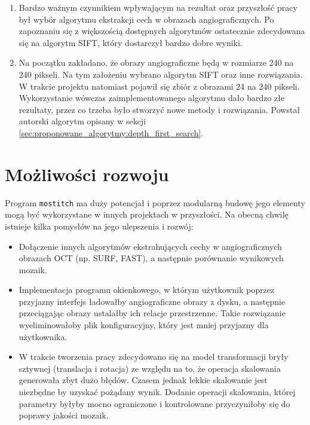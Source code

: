 \begin{enumerate}
\item Bardzo ważnym czynnikiem wpływającym na rezultat oraz przyszłość pracy był wybór algorytmu ekstrakcji cech w obrazach angiograficznych. Po zapoznaniu się z większością dostępnych algorytmów ostatecznie zdecydowana się na algorytm SIFT, który dostarczył bardzo dobre wyniki.
\item Na początku zakładano, że obrazy angiograficzne będą w rozmiarze 240 na 240 pikseli. Na tym założeniu wybrano algorytm SIFT oraz inne rozwiązania. W trakcie projektu natomiast pojawił się zbiór z obrazami 24 na 240 pikseli. Wykorzystanie wówczas zaimplementowanego algorytmu dało bardzo złe rezultaty, przez co trzeba było stworzyć nowe metody i rozwiązania. Powstał autorski algorytm opisany w sekcji \ref{sec:proponowane_algorytmy:depth_first_search}.
\end{enumerate}

\section{Możliwości rozwoju}
\label{sec:podsumowanie_i_wnioski:mozliwosci_rozwoju}

Program \texttt{mostitch} ma duży potencjał i poprzez modularną budowę jego elementy mogą być wykorzystane w innych projektach w przyszłości. Na obecną chwilę istnieje kilka pomysłów na jego ulepszenia i rozwój:

\begin{itemize}
\item Dołączenie innych algorytmów ekstrahujących cechy w angiograficznych obrazach OCT (np. SURF, FAST), a następnie porównanie wynikowych mozaik.
\item Implementacja programu okienkowego, w którym użytkownik poprzez przyjazny interfejs ładowałby angiograficzne obrazy z dysku, a następnie przeciągając obrazy ustalałby ich relacje przestrzenne. Takie rozwiązanie wyeliminowałoby plik konfiguracyjny, który jest mniej przyjazny dla użytkownika.
\item W trakcie tworzenia pracy zdecydowano się na model transformacji bryły sztywnej (translacja i rotacja) ze względu na to, że operacja skalowania generowała zbyt dużo błędów. Czasem jednak lekkie skalowanie jest niezbędne by uzyskać pożądany wynik. Dodanie operacji skalowania, której parametry byłyby mocno ograniczone i kontrolowane przyczyniłoby się do poprawy jakości mozaik.
\end{itemize}


